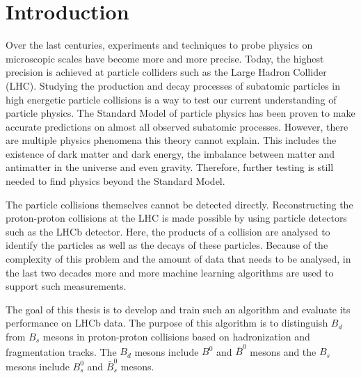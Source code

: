 \chapter{Introduction}

Over the last centuries, experiments and techniques to probe physics on microscopic scales have become more and more precise.
Today, the highest precision is achieved at particle colliders such as the Large Hadron Collider (LHC).
Studying the production and decay processes of subatomic particles in high energetic particle collisions is a way to test our current understanding of particle physics.
The Standard Model of particle physics has been proven to make accurate predictions on almost all observed subatomic processes.
However, there are multiple physics phenomena this theory cannot explain.
This includes the existence of dark matter and dark energy, the imbalance between matter and antimatter in the universe and even gravity.
Therefore, further testing is still needed to find physics beyond the Standard Model.

The particle collisions themselves cannot be detected directly.
Reconstructing the proton-proton collisions at the LHC is made possible by using particle detectors such as the LHCb detector.
Here, the products of a collision are analysed to identify the particles as well as the decays of these particles.
Because of the complexity of this problem and the amount of data that needs to be analysed, in the last two decades more and more machine learning algorithms are used to support such measurements.

The goal of this thesis is to develop and train such an algorithm and evaluate its performance on LHCb data.
The purpose of this algorithm is to distinguish $B_d$ from $B_s$ mesons in proton-proton collisions based on hadronization and fragmentation tracks. The $B_d$ mesons include $B^0$ and $\bar{B}^0$ mesons and the $B_s$ mesons include $B_s^0$ and $\bar{B}_s^0$ mesons.




















